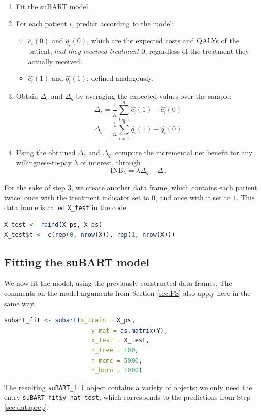 \documentclass[aoas,preprint]{imsart}
\theoremstyle{plain}
\theoremstyle{definition}
\theoremstyle{remark}
\theoremstyle{remark}
\begin{document}
\begin{enumerate}
    \item Fit the suBART model.
    \item For each patient $i$, predict according to the model:
    \begin{itemize}
        \item $\hat{c}_{i}(0)$ and $\hat{q}_{i}(0)$, which are the expected costs and QALYs of the patient, \emph{had they received treatment $0$}, regardless of the treatment they actually received. 
        \item $\hat{c_i}(1)$ and $\hat{q_i}(1)$; defined analogously.
    \end{itemize}
    \item Obtain $\Delta_c$ and $\Delta_q$ by averaging the expected values over the sample:
    $$\Delta_c = \frac{1}{n} \sum^n_{i = 1} \hat{c_i}(1) - \hat{c_i}(0)$$
    $$\Delta_q = \frac{1}{n} \sum^n_{i = 1} \hat{q_i}(1) - \hat{q_i}(0)$$
    \item Using the obtained $\Delta_c$ and $\Delta_q$, compute the incremental net benefit for any willingness-to-pay $\lambda$ of interest, through
    $$\text{INB}_{\lambda} = \lambda \Delta_q - \Delta_c$$    
\end{enumerate}
For the sake of step $3$, we create another data frame, which contains each patient twice: once with the treatment indicator set to $0$, and once with it set to $1$. This data frame is called \texttt{X\_test} in the code. 
\begin{lstlisting}[language=R, caption= {Constructing the test dataset with treatment indicators to estimate potential outcomes under both treatment and control conditions.}]
X_test <- rbind(X_ps, X_ps)
X_test$t <- c(rep(0, nrow(X)), rep(1, nrow(X)))
\end{lstlisting}

\subsection{Fitting the suBART model}
We now fit the model, using the previously constructed data frames. The comments on the model arguments from Section  \ref{sec:PS} also apply here in the same way.
\begin{lstlisting}[language=R, caption= Model fitting using suBART.] 
subart_fit <- subart(x_train = X_ps,
                        y_mat = as.matrix(Y),
                        x_test = X_test,
                        n_tree = 100,
                        n_mcmc = 5000,
                        n_burn = 1000)
\end{lstlisting}
The resulting \texttt{suBART\_fit} object contains a variety of objects; we only need the entry \texttt{suBART\_fit\$y\_hat\_test}, which corresponds to the predictions from Step \ref{sec:dataprep}. 
\end{document}
